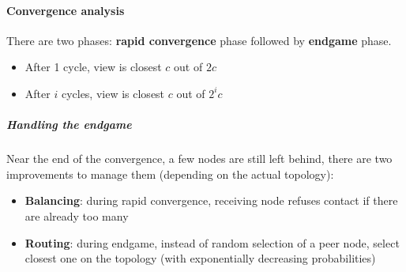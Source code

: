 \paragraph{Convergence analysis}
There are two phases: \textbf{rapid convergence} phase followed by
\textbf{endgame} phase.

\begin{itemize}
\item After 1 cycle, view is closest $c$ out of $2c$
\item After $i$ cycles, view is closest $c$ out of $2^i c$
\end{itemize}

\subparagraph{Handling the endgame}

Near the end of the convergence, a few nodes are still left behind, there are
two improvements to manage them (depending on the actual topology):

\begin{itemize}
\item \textbf{Balancing}: during rapid convergence, receiving node refuses
contact if there are already too many
\item \textbf{Routing}: during endgame, instead of random selection of a
peer node, select closest one on the topology (with
exponentially decreasing probabilities)
\end{itemize}
